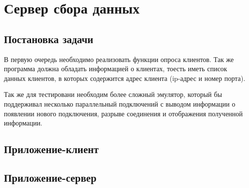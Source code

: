 \section{Сервер сбора данных}
\subsection{Постановка задачи}

В первую очередь необходимо реализовать функции опроса клиентов. Так же программа должна обладать информацией о клиентах, тоесть иметь список данных клиентов, в которых содержится адрес клиента (ip-адрес и номер порта).

Так же для тестировани необходим более сложный эмулятор, который бы поддерживал несколько параллельный подключений с выводом информации о появлении нового подключения, разрыве соединения и отображения полученной информации.

\subsection{Приложение-клиент}



\subsection{Приложение-сервер}

